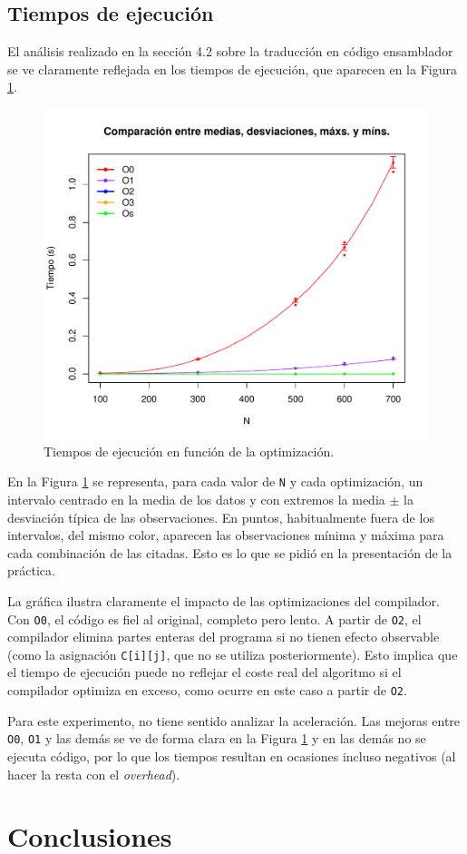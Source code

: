 \documentclass[11pt,a4paper,twoside]{article}
\theoremstyle{definition}
\begin{document}
	
	\subsection{Tiempos de ejecución}
	
	El análisis realizado en la sección 4.2 sobre la traducción en código ensamblador se ve claramente reflejada en los tiempos de ejecución, que aparecen en la Figura \ref{tiempos}.
	
	\begin{figure} [H] \centering
		\includegraphics[width=.8\textwidth]{../graficas/tiempos.pdf}
		\caption{Tiempos de ejecución en función de la optimización.}
		\label{tiempos}
	\end{figure}

	En la Figura \ref{tiempos} se representa, para cada valor de \texttt{N} y cada optimización, un intervalo centrado en la media de los datos y con extremos la media $\pm$ la desviación típica de las observaciones. En puntos, habitualmente fuera de los intervalos, del mismo color, aparecen las observaciones mínima y máxima para cada combinación de las citadas. Esto es lo que se pidió en la presentación de la práctica.
	
	La gráfica ilustra claramente el impacto de las optimizaciones del compilador. Con \texttt{O0}, el código es fiel al original, completo pero lento. A partir de \texttt{O2}, el compilador elimina partes enteras del programa si no tienen efecto observable (como la asignación \texttt{C[i][j]}, que no se utiliza posteriormente). Esto implica que el tiempo de ejecución puede no reflejar el coste real del algoritmo si el compilador optimiza en exceso, como ocurre en este caso a partir de \texttt{O2}.
	
	Para este experimento, no tiene sentido analizar la aceleración. Las mejoras entre \texttt{O0}, \texttt{O1} y las demás se ve de forma clara en la Figura \ref{tiempos} y en las demás no se ejecuta código, por lo que los tiempos resultan en ocasiones incluso negativos (al hacer la resta con el \textit{overhead}).
	
	
	\section{Conclusiones}


\printbibliography
	
	
\end{document}
